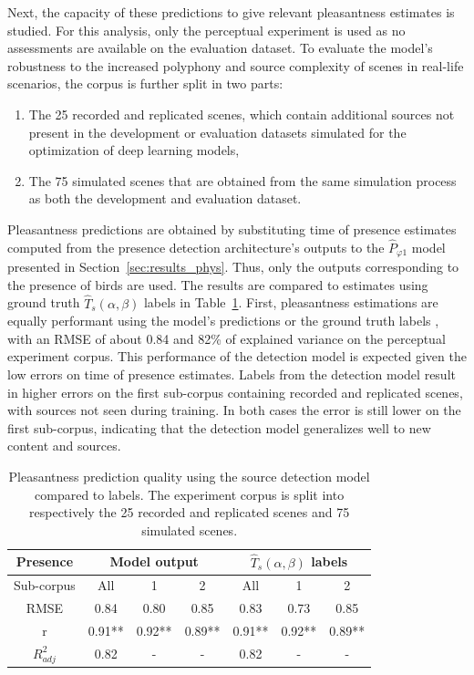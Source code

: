 \documentclass[11pt,a4paper]{article}
\begin{document}
Next, the capacity of these predictions to give relevant pleasantness estimates is studied. For this analysis, only the perceptual experiment is used as no assessments are available on the evaluation dataset. To evaluate the model's robustness to the increased polyphony and source complexity of scenes in real-life scenarios, the corpus is further split in two parts:
\begin{enumerate}
\item The 25 recorded and replicated scenes, which contain additional sources not present in the development or evaluation datasets simulated for the optimization of deep learning models,
\item The 75 simulated scenes that are obtained from the same simulation process as both the development and evaluation dataset.
\end{enumerate}
Pleasantness predictions are obtained by substituting time of presence estimates computed from the presence detection architecture's outputs to the $\hat P_{\varphi 1}$ model presented in Section~\ref{sec:results_phys}. Thus, only the outputs corresponding to the presence of birds are used. The results are compared to estimates using ground truth $\hat T_s(\alpha, \beta)$ labels in Table~\ref{tab:pppred}. First, pleasantness estimations are equally performant using the model's predictions or the ground truth labels , with an RMSE of about 0.84 and 82\% of explained variance on the perceptual experiment corpus. This performance of the detection model is expected given the low errors on time of presence estimates. Labels from the detection model result in higher errors on the first sub-corpus containing recorded and replicated scenes, with sources not seen during training. In both cases the error is still lower on the first sub-corpus, indicating that the detection model generalizes well to new content and sources.\\

\begin{table}[t]
\centering
\caption{Pleasantness prediction quality using the source detection model compared to labels. The experiment corpus is split into respectively the 25 recorded and replicated scenes and 75 simulated scenes.}
\label{tab:pppred}
\begin{tabular}{ c | c c c | c c c }
\hline
	Presence & \multicolumn{3}{|c}{Model output} & \multicolumn{3}{|c}{$\hat T_s(\alpha, \beta)$ labels} \\ \hline
	Sub-corpus & All & 1 & 2 & All & 1 & 2 \\ \hline
	RMSE & 0.84 & 0.80 & 0.85 & 0.83 & 0.73 & 0.85 \\ \hline
	r & 0.91** & 0.92** & 0.89** & 0.91** & 0.92** & 0.89** \\ \hline
	$R^2_{adj}$ & 0.82 & - & - & 0.82 & - & - \\ \hline
\end{tabular}
\end{table}
\end{document}
